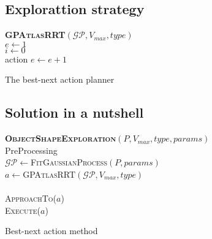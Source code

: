 \documentclass[twocolumn,draft,natbib]{svjour3}
\begin{document}
\subsection{Explorattion strategy}
\label{sec:strategy}


\begin{algorithm}[h]
\textbf{\textsc{GPAtlasRRT}}$(\mathcal{GP}, V_{max}, type)$\\ %
\LinesNumbered
\DontPrintSemicolon
\SetAlgoVlined {} 
  $e \leftarrow 1$ \\
  {
    $i \leftarrow 0$ \\
    {
      \Return action 
    }
    $e \leftarrow e + 1$ \\
  }

\caption{The best-next action planner} \label{algo:strategy}
\end{algorithm}

\subsection{Solution in a nutshell}
\label{sec:summary}

\begin{algorithm}[h]
\textbf{\textsc{ObjectShapeExploration}}$(P, V_{max}, type, params)$\\ %
\LinesNumbered
\DontPrintSemicolon
\SetAlgoVlined {} 
  PreProcessing \\
  $\mathcal{GP} \leftarrow $\textsc{FitGaussianProcess}$(P, params)$\\
  {
    $a \leftarrow $\textsc{GPAtlasRRT}$(\mathcal{GP}, V_{max}, type)$ \\
    {
       \\
    }
    {
      \textsc{ApproachTo}($a$) \\
      \textsc{Execute}($a$) \\
    }
  }
  \Return 

\caption{Best-next action method} \label{algo:strategy}
\end{algorithm}
\end{document}
